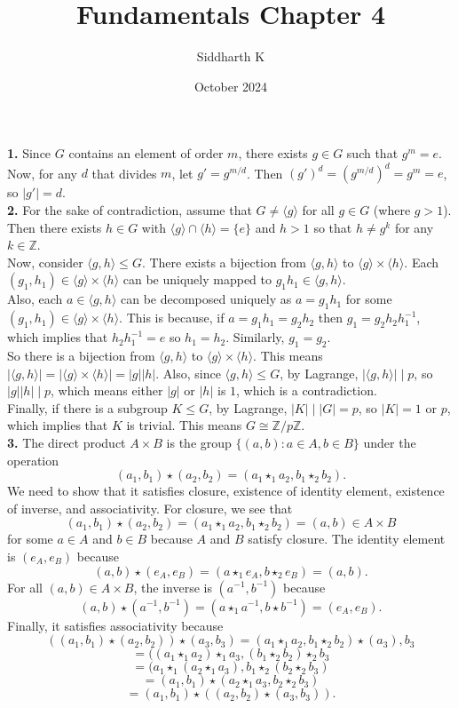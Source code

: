 \documentclass{article}
\title{Fundamentals Chapter 4}
\author{Siddharth K}
\date{October 2024}
\newcommand{\Z}{\mathbb{Z}}
\newcommand{\la}{\langle}
\newcommand{\ra}{\rangle}
\begin{document}
\maketitle

\textbf{1.} Since $G$ contains an element of order $m$, there exists $g \in G$ such that $g^m = e$. Now, for any $d$ that divides $m$, let $g' = g^{m/d}$. Then $(g')^d = (g^{m/d})^d = g^m = e$, so $|g'| = d$. \\

\textbf{2.} For the sake of contradiction, assume that $G \neq \la g\ra$ for all $g \in G$ (where $g > 1$). Then there exists $h \in G$ with $\la g\ra \cap \la h\ra = \{e\}$ and $h > 1$ so that $h \neq g^k$ for any $k \in \Z$. \\

Now, consider $\la g, h\ra \le G$. There exists a bijection from $\la g, h\ra$ to $\la g\ra \times \la h\ra$. Each $(g_1, h_1) \in \la g\ra \times \la h\ra$ can be uniquely mapped to $g_1h_1 \in \la g, h\ra$. \\

Also, each $a \in \la g, h\ra$ can be decomposed uniquely as $a = g_1h_1$ for some $(g_1, h_1) \in \la g\ra \times \la h\ra$. This is because, if $a = g_1h_1 = g_2h_2$ then $g_1 = g_2h_2h_1^{-1}$, which implies that $h_2h_1^{-1} = e$ so $h_1 = h_2$. Similarly, $g_1 = g_2$. \\

So there is a bijection from $\la g, h\ra$ to $\la g\ra \times \la h\ra$. This means $|\la g, h\ra| = |\la g\ra \times \la h\ra| = |g||h|$. Also, since $\la g, h\ra \le G$, by Lagrange, $|\la g, h\ra| \mid p$, so $|g||h| \mid p$, which means either $|g|$ or $|h|$ is $1$, which is a contradiction. \\

Finally, if there is a subgroup $K \le G$, by Lagrange, $|K| \mid |G| = p$, so $|K| = 1$ or $p$, which implies that $K$ is trivial. This means $G \cong \Z/p\Z$. \\

\textbf{3.} The direct product $A \times B$ is the group $\{(a, b): a \in A, b \in B\}$ under the operation
$$(a_1, b_1) \star (a_2, b_2) = (a_1 \star_1 a_2, b_1 \star_2 b_2).$$
We need to show that it satisfies closure, existence of identity element, existence of inverse, and associativity. For closure, we see that
$$(a_1, b_1) \star (a_2, b_2) = (a_1 \star_1 a_2, b_1 \star_2 b_2) = (a, b) \in A \times B$$
for some $a \in A$ and $b \in B$ because $A$ and $B$ satisfy closure. The identity element is $(e_A, e_B)$ because
$$(a, b) \star (e_A, e_B) = (a\star_1 e_A, b\star_2 e_B) = (a, b).$$
For all $(a, b) \in A\times B$, the inverse is $(a^{-1}, b^{-1})$ because
$$(a, b) \star (a^{-1}, b^{-1}) = (a\star_1 a^{-1}, b\star b^{-1}) = (e_A, e_B).$$
Finally, it satisfies associativity because
$$((a_1, b_1) \star (a_2, b_2)) \star (a_3, b_3) = (a_1\star_1 a_2, b_1\star_2 b_2) \star (a_3), b_3$$
$$= ((a_1\star_1 a_2)\star_1 a_3, (b_1\star_2 b_2)\star_2 b_3$$
$$= (a_1\star_1 (a_2\star_1 a_3), b_1\star_2 (b_2\star_2 b_3)$$
$$= (a_1, b_1)\star (a_2\star_1 a_3, b_2\star_2 b_3)$$
$$= (a_1, b_1)\star ((a_2, b_2)\star (a_3, b_3)).$$
\end{document}
